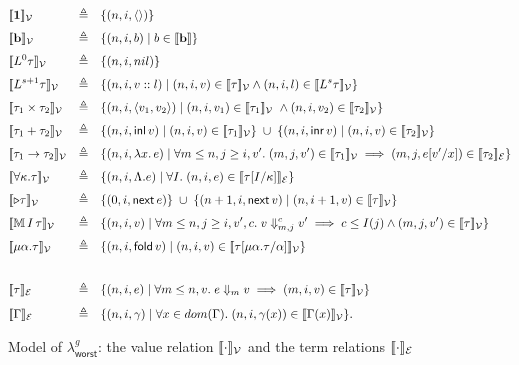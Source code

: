 \begin{figure}[H]
\small
\setlength{\jot}{1.5pt}
\[
\begin{alignedat}{2}
&\llbracket \textbf{1} \rrbracket_{\mathcal{V}}
  &\quad\triangleq\quad& \{(n,i,\langle\rangle)\} \\[0.5ex]
&\llbracket \textbf{b} \rrbracket_{\mathcal{V}}
  &\quad\triangleq\quad& \{(n,i,b) \mid b\in \llbracket \textbf{b}\rrbracket\} \\[0.5ex]
&\llbracket L^0\tau \rrbracket_{\mathcal{V}}
  &\quad\triangleq\quad& \{(n,i,nil)\} \\[0.5ex]
&\llbracket L^{s+1}\tau \rrbracket_{\mathcal{V}}
  &\quad\triangleq\quad&
    \{(n,i,v::l) \mid (n,i,v)\in\llbracket \tau \rrbracket_{\mathcal{V}}
    \land (n,i,l)\in\llbracket L^s\tau \rrbracket_{\mathcal{V}}\} \\[0.5ex]
&\llbracket \tau_1\times\tau_2 \rrbracket_{\mathcal{V}}
  &\quad\triangleq\quad&
    \{(n,i,\langle v_1, v_2\rangle) \mid (n,i,v_1)\in\llbracket \tau_1 \rrbracket_{\mathcal{V}}\ \land (n,i,v_2)\in\llbracket \tau_2 \rrbracket_{\mathcal{V}}\} \\[0.5ex]
&\llbracket \tau_1+\tau_2 \rrbracket_{\mathcal{V}}
  &\quad\triangleq\quad&
    \{(n,i,\mathsf{inl}\,v) \mid (n,i,v)\in\llbracket \tau_1 \rrbracket_{\mathcal{V}}\}\;\cup\;\{(n,i,\mathsf{inr}\,v) \mid (n,i,v)\in\llbracket \tau_2 \rrbracket_{\mathcal{V}}\} \\[0.5ex]
&\llbracket \tau_1\to\tau_2 \rrbracket_{\mathcal{V}}
  &\quad\triangleq\quad&
    \{(n,i,\lambda x.\,e) \mid \forall m\leq n,j\geq i,v'.\; (m,j,v')\in\llbracket \tau_1 \rrbracket_{\mathcal{V}}
        \implies (m,j,e[v'/x])\in\llbracket \tau_2 \rrbracket_{\mathcal{E}}\} \\[0.5ex]
&\llbracket \forall\kappa.\tau \rrbracket_{\mathcal{V}}
  &\quad\triangleq\quad&
    \{(n,i,\Lambda.e) \mid \forall I.\;(n,i,e)\in\llbracket \tau[I/\kappa] \rrbracket_{\mathcal{E}}\} \\[0.5ex]
&\llbracket \triangleright\tau \rrbracket_{\mathcal{V}}
  &\quad\triangleq\quad&
    \{(0,i,\mathsf{next}\, e)\}\;\cup\;\{(n+1,i,\mathsf{next}\, v) \mid (n,i+1,v)\in\llbracket \tau \rrbracket_{\mathcal{V}}\} \\[0.5ex]
&\llbracket \mathbb{M}\,{I}\, \tau \rrbracket_{\mathcal{V}}
  &\quad\triangleq\quad&
    \{(n,i,v) \mid \forall m\leq n,j\geq i,v',c.\; v\Downarrow^c_{m,j}v'\implies c\leq I(j)
        \land (m,j,v')\in\llbracket \tau \rrbracket_{\mathcal{V}}\} \\[0.5ex]
&\llbracket \mu\alpha.\tau \rrbracket_{\mathcal{V}}
  &\quad\triangleq\quad&
    \{(n,i,\mathsf{fold}\, v) \mid (n,i,v)\in\llbracket \tau[\mu\alpha.\tau/\alpha] \rrbracket_{\mathcal{V}}\} \\[0.8ex]
\\
&\llbracket \tau \rrbracket_{\mathcal{E}}
  &\quad\triangleq\quad&
    \{(n,i,e) \mid \forall m\leq n,v.\; e\Downarrow_m v\implies (m,i,v)\in\llbracket \tau \rrbracket_{\mathcal{V}}\} \\[0.8ex]
&\llbracket \Gamma \rrbracket_{\mathcal{E}}
  &\quad\triangleq\quad&
    \{(n,i,\gamma) \mid \forall x\in dom(\Gamma).\;
        (n,i,\gamma(x))\in\llbracket \Gamma(x) \rrbracket_{\mathcal{V}}\}.
\end{alignedat}
\]
\caption{Model of $\lambda^g_{\mathsf{worst}}$: the value relation $\llbracket \cdot \rrbracket_{\mathcal{V}}$ and the term relations $\llbracket \cdot \rrbracket_{\mathcal{E}}$}
\label{fig:worst-case-logical-relation}
\end{figure}

